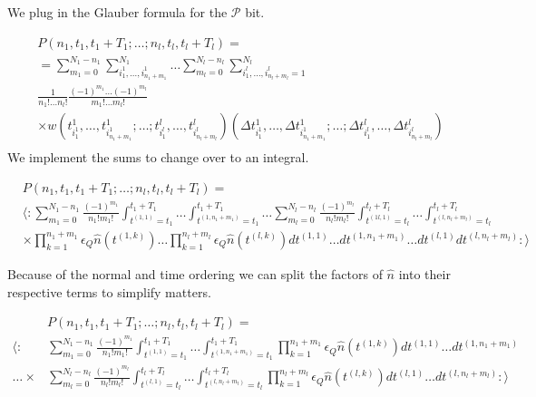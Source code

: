 \documentclass[12pt]{article}
\begin{document}
We plug in the Glauber formula for the $\mathcal{P}$ bit.

\begin{align}
&P(n_1,t_1,t_1+T_1;\ldots ;n_l,t_l,t_l+T_l) =\\
&=\sum_{m_1=0}^{N_1-n_1} \sum_{i^1_1, \ldots ,i^1_{n_1+m_1}}^{N_1} \ldots \sum_{m_l=0}^{N_l-n_l}\sum_{i^l_{1}, \ldots ,i^l_{n_l+m_l}=1}^{N_l}\\ 
&\frac{1}{n_1! \ldots n_l!}\frac{(-1)^{m_1}\ldots(-1)^{m_l}}{m_1! \ldots m_l!}\\
&\times w(t^1_{i^1_1},\ldots ,t^1_{i^1_{n_1+m_1}};\ldots ; t^l_{i^l_1}, \ldots ,t^l_{i^l_{n_l+m_l}})(\Delta t^1_{i^1_1},\ldots ,\Delta t^1_{i^1_{n_1+m_1}};\ldots ; \Delta t^l_{i^l_1}, \ldots ,\Delta t^l_{i^l_{n_l+m_l}})\\
\end{align}
We implement the sums to change over to an integral.

\begin{align}
&P(n_1,t_1,t_1+T_1;\ldots ;n_l,t_l,t_l+T_l) =\\
&\Bigg\langle : \sum_{m_1=0}^{N_1-n_1} \frac{(-1)^{m_1}}{n_1 ! m_1!} \int_{t^{(1,1)}=t_1}^{t_1+T_1} \ldots \int_{t^{(1,n_1+m_1)}=t_1}^{t_1+T_1} \ldots \sum_{m_l=0}^{N_l-n_l} \frac{(-1)^{m_l}}{n_l ! m_l!} \int_{t^{(1l,1)}=t_l}^{t_l+T_l} \ldots \int_{t^{(l,n_l+m_l)}=t_l}^{t_l+T_l}\\
&\times \prod_{k=1}^{n_1+m_1} \epsilon_Q \hat{n}(t^{(1,k)}) \ldots \prod_{k=1}^{n_l+m_l} \epsilon_Q \hat{n}(t^{(l,k)}) dt^{(1,1)}\ldots dt^{(1,n_1+m_1)} \ldots dt^{(l,1)} dt^{(l,n_l+m_l)}:\Bigg\rangle
\end{align}

Because of the normal and time ordering we can split the factors of $\hat{n}$ into their respective terms to simplify matters.

\begin{align}
&P(n_1,t_1,t_1+T_1;\ldots ;n_l,t_l,t_l+T_l) =\\
\Bigg \langle: &\sum_{m_1=0}^{N_1-n_1} \frac{(-1)^{m_1}}{n_1 ! m_1!} \int_{t^{(1,1)}=t_1}^{t_1+T_1} \ldots \int_{t^{(1,n_1+m_1)}=t_1}^{t_1+T_1} \prod_{k=1}^{n_1+m_1} \epsilon_Q \hat{n}(t^{(1,k)}) dt^{(1,1)} \ldots dt^{(1,n_1+m_1)}\\
\ldots \times &\sum_{m_l=0}^{N_l-n_l} \frac{(-1)^{m_l}}{n_l ! m_l!} \int_{t^{(l,1)}=t_l}^{t_l+T_l} \ldots \int_{t^{(l,n_l+m_l)}=t_l}^{t_l+T_l} \prod_{k=1}^{n_l+m_l} \epsilon_Q \hat{n}(t^{(l,k)}) dt^{(l,1)} \ldots dt^{(l,n_l+m_l)}:\Bigg \rangle
\end{align}
\end{document}
